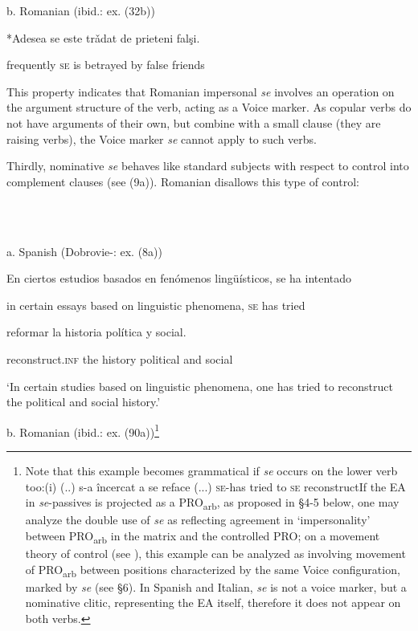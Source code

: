 \documentclass[output=paper]{langsci/langscibook}
\begin{document}
  b.  Romanian (ibid.: ex. (32b))

*Adesea     se  este trǎdat      de  prieteni falşi. 

          frequently \textsc{se} is     betrayed by false      friends  

This property indicates that Romanian impersonal \textit{se} involves an operation on the argument structure of the verb, acting as a Voice marker. As copular verbs do not have arguments of their own, but combine with a small clause (they are raising verbs), the Voice marker \textit{se} cannot apply to such verbs.

Thirdly, nominative \textit{se} behaves like standard subjects with respect to control into complement clauses (see (9a)). Romanian disallows this type of control:

\ea%
    \label{ex:key:9}
    \gll\\
        \\
    \glt
    \z

          a.   Spanish (Dobrovie-\citealt{Sorin2017}: ex. (8a))

En ciertos estudios basados en fenómenos lingüísticos, se ha  intentado 

        in  certain essays     based   on linguistic    phenomena, \textsc{se} has tried 

        reformar           la  historia política y     social.  

        reconstruct.\textsc{inf} the history political and social

‘In certain studies based on linguistic phenomena, one has tried to reconstruct the political and social history.’               

b.   Romanian (ibid.: ex. (90a))\footnote{Note that this example becomes grammatical if \textit{se} occurs on the lower verb too:(i)  (..) s-a       încercat a   se  reface (...)       \textsc{se-}has tried        to \textsc{se} reconstructIf the EA in \textit{se}{}-passives is projected as a PRO\textsubscript{arb}, as proposed in §4-5 below, one may analyze the double use of \textit{se} as reflecting agreement in ‘impersonality’ between PRO\textsubscript{arb} in the matrix and the controlled PRO; on a movement theory of control (see \citealt{Hornstein1999}), this example can be analyzed as involving movement of PRO\textsubscript{arb} between positions characterized by the same Voice configuration, marked by \textit{se} (see §6). In Spanish and Italian, \textit{se} is not a voice marker, but a nominative clitic, representing the EA itself, therefore it does not appear on both verbs.}
\end{document}
